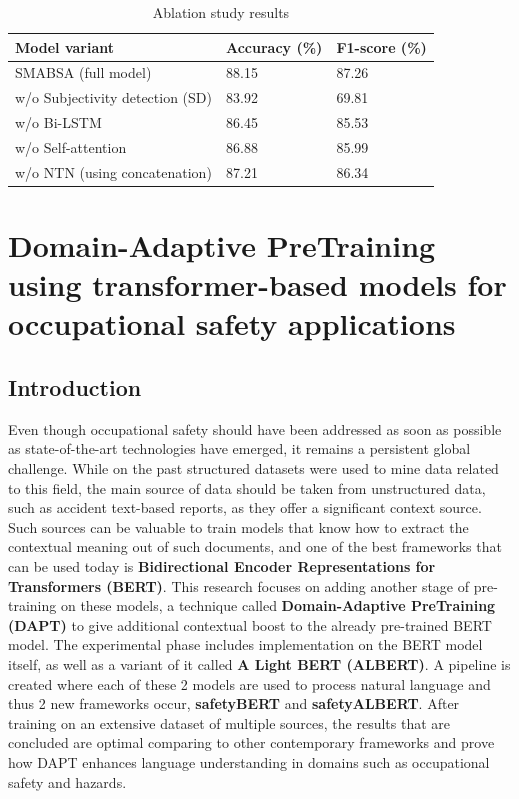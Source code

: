 \documentclass[a4paper,12pt]{article}
\begin{document}
\begin{table}[htpb]
\centering
\begin{tabular}{lll}
\toprule
Model variant & Accuracy (\%) & F1-score (\%) \\
\midrule
SMABSA (full model) & 88.15 & 87.26 \\
w/o Subjectivity detection (SD) & 83.92 & 69.81 \\
w/o Bi-LSTM & 86.45 & 85.53 \\
w/o Self-attention & 86.88 & 85.99 \\
w/o NTN (using concatenation) & 87.21 & 86.34 \\
\bottomrule
\end{tabular}
\caption{Ablation study results}
\label{tab:ablation_SMABSA}
\end{table}


\section{Domain-Adaptive PreTraining using transformer-based models for occupational safety applications}

\subsection{Introduction}
Even though occupational safety should have been addressed as soon as possible as state-of-the-art technologies have emerged, it remains a persistent global challenge. While on the past structured datasets were used to mine data related to this field, the main source of data should be taken from unstructured data, such as accident text-based reports, as they offer
a significant context source. Such sources can be valuable to train models that know how to extract the contextual meaning out of such documents, and one of the best frameworks that can be used today is \textbf{Bidirectional Encoder Representations for Transformers (BERT)}. This research focuses on adding another stage of pre-training on these models, a technique
called \textbf{Domain-Adaptive PreTraining (DAPT)} to give additional contextual boost to the already pre-trained BERT model. The experimental phase includes implementation on the BERT model itself, as well as a variant of it called \textbf{A Light BERT (ALBERT)}. A pipeline is created where each of these 2 models are used to process natural language and thus 2 new frameworks
occur, \textbf{safetyBERT} and \textbf{safetyALBERT}. After training on an extensive dataset of multiple sources, the results that are concluded
are optimal comparing to other contemporary frameworks and prove how DAPT enhances language understanding in domains such as occupational safety and hazards.
\end{document}
